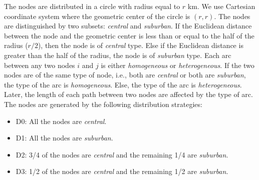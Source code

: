 The nodes are distributed in a circle with radius equal to $r$ km. We use Cartesian coordinate system where the geometric center of the circle is $(r,r)$. The nodes are distinguished by two subsets: \textit{central} and \textit{suburban}. If the Euclidean distance between the node and the geometric center is less than or equal to the half of the radius ($r/2$), then the node is of \textit{central} type. Else if the Euclidean distance is greater than the half of the radius, the node is of \textit{suburban} type. Each arc between any two nodes $i$ and $j$ is either \textit{homogeneous} or \textit{heterogeneous}. If the two nodes are of the same type of node, i.e., both are \textit{central} or both are \textit{suburban}, the type of the arc is \textit{homogeneous}. Else, the type of the arc is \textit{heterogeneous}. Later, the length of each path between two nodes are affected by the type of arc. The nodes are generated by the following distribution strategies:
\begin{itemize}
	\item D0: All the nodes are \textit{central}.
	\item D1: All the nodes are \textit{suburban}.
	\item D2: 3/4 of the nodes are \textit{central} and the remaining 1/4 are \textit{suburban}.
	\item D3: 1/2 of the nodes are \textit{central} and the remaining 1/2 are \textit{suburban}.
\end{itemize}



